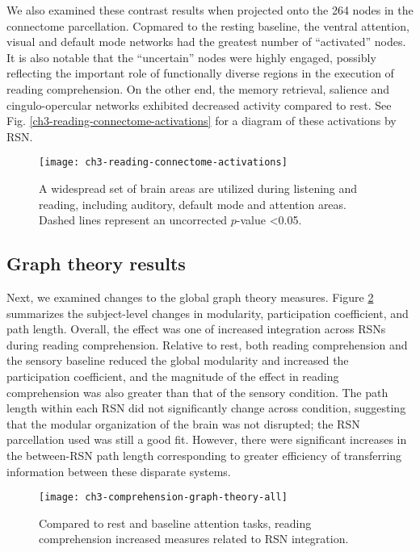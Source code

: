 We also examined these contrast results when projected onto the 264 nodes in the connectome parcellation. Copmared to the resting baseline, the ventral attention, visual and default mode networks had the greatest number of ``activated'' nodes. It is also notable that the ``uncertain'' nodes were highly engaged, possibly reflecting the important role of functionally diverse regions in the execution of reading comprehension. On the other end, the memory retrieval, salience and cingulo-opercular networks exhibited decreased activity compared to rest. See Fig. \ref{ch3-reading-connectome-activations} for a diagram of these activations by RSN. 

\begin{figure}[t]
	\centering
	\texttt{[image: ch3-reading-connectome-activations]}
    \caption[Distribution of reading-related activity among RSN nodes.]{A widespread set of brain areas are utilized during listening and reading, including auditory, default mode and attention areas. Dashed lines represent an uncorrected $p$-value \textless 0.05.}
	\label{fig:ch3-reading-connectome-activations}
\end{figure}


\subsection{Graph theory results}

Next, we examined changes to the global graph theory measures. Figure \ref{fig:ch3-comprehension-graph-theory-all} summarizes the subject-level changes in modularity, participation coefficient, and path length. Overall, the effect was one of increased integration across RSNs during reading comprehension. Relative to rest, both reading comprehension and the sensory baseline reduced the global modularity and increased the participation coefficient, and the magnitude of the effect in reading comprehension was also greater than that of the sensory condition. The path length within each RSN did not significantly change across condition, suggesting that the modular organization of the brain was not disrupted; the RSN parcellation used was still a good fit. However, there were significant increases in the between-RSN path length corresponding to greater efficiency of transferring information between these disparate systems.

\begin{figure}[t]
	\centering
	\texttt{[image: ch3-comprehension-graph-theory-all]}
    \caption[Reading induces more integrated global network architecture.]{Compared to rest and baseline attention tasks, reading comprehension increased measures related to RSN integration.}
	\label{fig:ch3-comprehension-graph-theory-all}
\end{figure}

